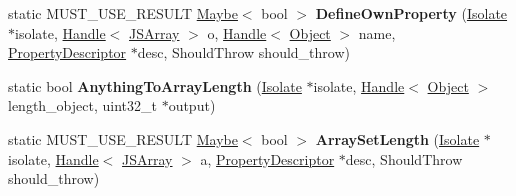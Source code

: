\begin{DoxyCompactItemize}
\item 
static M\+U\+S\+T\+\_\+\+U\+S\+E\+\_\+\+R\+E\+S\+U\+LT \hyperlink{classv8_1_1_maybe}{Maybe}$<$ bool $>$ {\bfseries Define\+Own\+Property} (\hyperlink{classv8_1_1internal_1_1_isolate}{Isolate} $\ast$isolate, \hyperlink{classv8_1_1internal_1_1_handle}{Handle}$<$ \hyperlink{classv8_1_1internal_1_1_j_s_array}{J\+S\+Array} $>$ o, \hyperlink{classv8_1_1internal_1_1_handle}{Handle}$<$ \hyperlink{classv8_1_1internal_1_1_object}{Object} $>$ name, \hyperlink{classv8_1_1internal_1_1_property_descriptor}{Property\+Descriptor} $\ast$desc, Should\+Throw should\+\_\+throw)\hypertarget{classv8_1_1internal_1_1_j_s_array_a6bcefd1ec362326a85e9e5e072883d27}{}\label{classv8_1_1internal_1_1_j_s_array_a6bcefd1ec362326a85e9e5e072883d27}

\item 
static bool {\bfseries Anything\+To\+Array\+Length} (\hyperlink{classv8_1_1internal_1_1_isolate}{Isolate} $\ast$isolate, \hyperlink{classv8_1_1internal_1_1_handle}{Handle}$<$ \hyperlink{classv8_1_1internal_1_1_object}{Object} $>$ length\+\_\+object, uint32\+\_\+t $\ast$output)\hypertarget{classv8_1_1internal_1_1_j_s_array_ab1c733216a8e34bb2a814162dabd8008}{}\label{classv8_1_1internal_1_1_j_s_array_ab1c733216a8e34bb2a814162dabd8008}

\item 
static M\+U\+S\+T\+\_\+\+U\+S\+E\+\_\+\+R\+E\+S\+U\+LT \hyperlink{classv8_1_1_maybe}{Maybe}$<$ bool $>$ {\bfseries Array\+Set\+Length} (\hyperlink{classv8_1_1internal_1_1_isolate}{Isolate} $\ast$isolate, \hyperlink{classv8_1_1internal_1_1_handle}{Handle}$<$ \hyperlink{classv8_1_1internal_1_1_j_s_array}{J\+S\+Array} $>$ a, \hyperlink{classv8_1_1internal_1_1_property_descriptor}{Property\+Descriptor} $\ast$desc, Should\+Throw should\+\_\+throw)\hypertarget{classv8_1_1internal_1_1_j_s_array_a1a85c4694c5c524713cf52d58d577049}{}\label{classv8_1_1internal_1_1_j_s_array_a1a85c4694c5c524713cf52d58d577049}

\end{DoxyCompactItemize}
